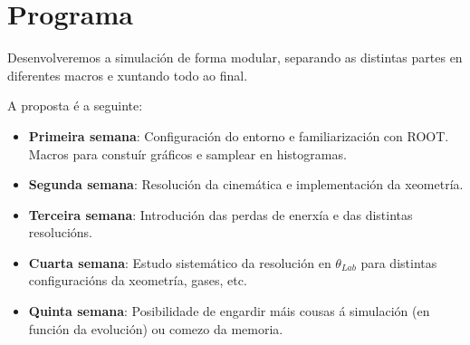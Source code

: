 \documentclass[11pt, a4paper]{article}
\begin{document}
\section{Programa}
Desenvolveremos a simulación de forma modular, separando as distintas partes en diferentes macros e xuntando todo ao final.

A proposta é a seguinte:
\begin{itemize}
    \item \textbf{Primeira semana}: Configuración do entorno e familiarización con ROOT. Macros para constuír gráficos e samplear en histogramas.
    \item \textbf{Segunda semana}: Resolución da cinemática e implementación da xeometría.
    \item \textbf{Terceira semana}: Introdución das perdas de enerxía e das distintas resolucións.
    \item \textbf{Cuarta semana}: Estudo sistemático da resolución en $\theta_{Lab}$ para distintas configuracións da xeometría, gases, etc.
    \item \textbf{Quinta semana}: Posibilidade de engardir máis cousas á simulación (en función da evolución) ou comezo da memoria.
\end{itemize}



\end{document}
